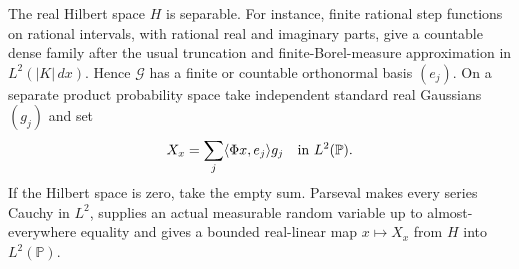 \documentclass[11pt]{article}
\begin{document}
The real Hilbert space $H$ is separable. For instance, finite rational
step functions on rational intervals, with rational real and imaginary
parts, give a countable dense family after the usual truncation and
finite-Borel-measure approximation in $L^2(|K|\,dx)$. Hence $\mathcal G$
has a finite or countable orthonormal basis $(e_j)$. On a separate product
probability space take independent standard real Gaussians $(g_j)$ and set
\begin{equation}\label{eq:gaussiangreen}
 X_x=\sum_j\langle \Phi x,e_j\rangle g_j\quad\hbox{in }L^2(\mathbb P).
\end{equation}
If the Hilbert space is zero, take the empty sum. Parseval makes every
series Cauchy in $L^2$, supplies an actual measurable random variable
up to almost-everywhere equality and gives a bounded real-linear map
$x\mapsto X_x$ from $H$ into $L^2(\mathbb P)$.
\end{document}

